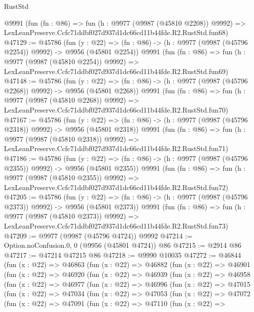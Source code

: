 \begin{lexlean}{RustStd}
\begin{coremodule}
    @9991
    (fun (fn : @86) =>
    fun (h : @9977 (@9987 (@45810 @2208)) @9992) =>
    LexLeanPreserve.Ccfc71ddbf027d937d1dc66cd11b44fde.R2.RustStd.fun68)
@47129 := @45786
    (fun (y : @22) =>
    (fn : @86) -> (h : @9977 (@9987 (@45796 @2254)) @9992) -> @9956 (@45801 @2254))
    @9991
    (fun (fn : @86) =>
    fun (h : @9977 (@9987 (@45810 @2254)) @9992) =>
    LexLeanPreserve.Ccfc71ddbf027d937d1dc66cd11b44fde.R2.RustStd.fun69)
@47148 := @45786
    (fun (y : @22) =>
    (fn : @86) -> (h : @9977 (@9987 (@45796 @2268)) @9992) -> @9956 (@45801 @2268))
    @9991
    (fun (fn : @86) =>
    fun (h : @9977 (@9987 (@45810 @2268)) @9992) =>
    LexLeanPreserve.Ccfc71ddbf027d937d1dc66cd11b44fde.R2.RustStd.fun70)
@47167 := @45786
    (fun (y : @22) =>
    (fn : @86) -> (h : @9977 (@9987 (@45796 @2318)) @9992) -> @9956 (@45801 @2318))
    @9991
    (fun (fn : @86) =>
    fun (h : @9977 (@9987 (@45810 @2318)) @9992) =>
    LexLeanPreserve.Ccfc71ddbf027d937d1dc66cd11b44fde.R2.RustStd.fun71)
@47186 := @45786
    (fun (y : @22) =>
    (fn : @86) -> (h : @9977 (@9987 (@45796 @2355)) @9992) -> @9956 (@45801 @2355))
    @9991
    (fun (fn : @86) =>
    fun (h : @9977 (@9987 (@45810 @2355)) @9992) =>
    LexLeanPreserve.Ccfc71ddbf027d937d1dc66cd11b44fde.R2.RustStd.fun72)
@47205 := @45786
    (fun (y : @22) =>
    (fn : @86) -> (h : @9977 (@9987 (@45796 @2373)) @9992) -> @9956 (@45801 @2373))
    @9991
    (fun (fn : @86) =>
    fun (h : @9977 (@9987 (@45810 @2373)) @9992) =>
    LexLeanPreserve.Ccfc71ddbf027d937d1dc66cd11b44fde.R2.RustStd.fun73)
@47209 := @9977 (@9987 (@45796 @4724)) @9992
@47214 := Option.noConfusion.{0, 0} (@9956 (@45801 @4724)) @86
@47215 := @2914 @86
@47217 := @47214 @47215 @86
@47218 := @9990 @10035
@47272 := @46844
    (fun (x : @22) =>
    @46863
      (fun (x : @22) =>
      @46882
        (fun (x : @22) =>
        @46901
          (fun (x : @22) =>
          @46920
            (fun (x : @22) =>
            @46939
              (fun (x : @22) =>
              @46958
                (fun (x : @22) =>
                @46977
                  (fun (x : @22) =>
                  @46996
                    (fun (x : @22) =>
                    @47015
                      (fun (x : @22) =>
                      @47034
                        (fun (x : @22) =>
                        @47053
                          (fun (x : @22) =>
                          @47072
                            (fun (x : @22) =>
                            @47091
                              (fun (x : @22) =>
                              @47110
                                (fun (x : @22) =>

\end{coremodule}
\end{lexlean}
